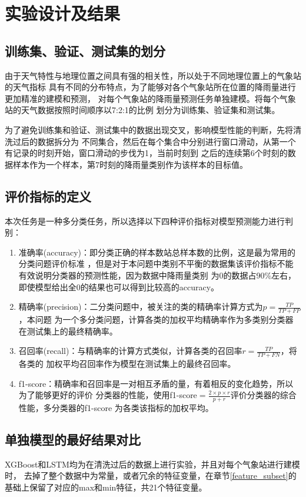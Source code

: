 \documentclass[UTF8]{ctexart}
\begin{document}
\section{实验设计及结果}

\subsection{训练集、验证、测试集的划分}
由于天气特性与地理位置之间具有强的相关性，所以处于不同地理位置上的气象站的天气指标
具有不同的分布特点，为了能够对各个气象站所在位置的降雨量进行更加精准的建模和预测，
对每个气象站的降雨量预测任务单独建模。将每个气象站的天气数据按照时间顺序以7:2:1的比例
划分为训练集、验证集和测试集。

为了避免训练集和验证、测试集中的数据出现交叉，影响模型性能的判断，先将清洗过后的数据拆分为
不同集合，然后在每个集合中分别进行窗口滑动，从第一个有记录的时刻开始，窗口滑动的步伐为1，当前时刻到
之后的连续第6个时刻的数据样本作为一个样本，第7时刻的降雨量类别作为该样本的目标值。


\subsection{评价指标的定义}
本次任务是一种多分类任务，所以选择以下四种评价指标对模型预测能力进行判别：
\begin{enumerate}
    \item 准确率(accuracy)：即分类正确的样本数站总样本数的比例，这是最为常用的分类问题评价标准
    ，但是对于本问题中类别不平衡的数据集该评价指标不能有效说明分类器的预测性能，因为数据中降雨量类别
    为0的数据占90\%左右，即使模型给出全0的结果也可以得到比较高的accuracy。
    \item 精确率(precision)：二分类问题中，被关注的类的精确率计算方式为$p=\frac{TP}{TP+FP}$，本问题
    为一个多分类问题，计算各类的加权平均精确率作为多类别分类器在测试集上的最终精确率。
    \item 召回率(recall)：与精确率的计算方式类似，计算各类的召回率$r=\frac{TP}{TP+FN}$，将各类的
    加权平均召回率作为模型在测试集上的最终召回率。
    \item f1-score：精确率和召回率是一对相互矛盾的量，有着相反的变化趋势，所以为了能够更好的评价
    分类器的性能，使用f1-score$= \frac{2\times p\times r}{p+r}$评价分类器的综合性能，多分类器的f1-score
    为各类该指标的加权平均。
\end{enumerate}

\subsection{单独模型的最好结果对比}
XGBoost和LSTM均为在清洗过后的数据上进行实验，并且对每个气象站进行建模时，
去掉了整个数据中为常量，或者冗余的特征变量，在章节\ref{feature_subset}的基础上保留了对应的max和min特征，共21个特征变量。
\end{document}
